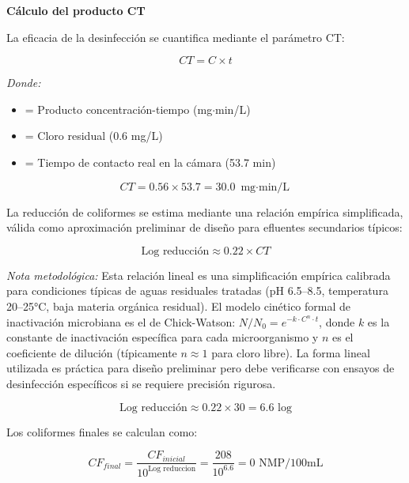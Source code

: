\documentclass[12pt,a4paper]{article}
\begin{document}
\textbf{Cálculo del producto CT}

La eficacia de la desinfección se cuantifica mediante el parámetro CT:

\begin{equation}
CT = C \times t
\end{equation}

\textit{Donde:}
\begin{itemize}[noitemsep,leftmargin=2em]
    \item[$CT$] = Producto concentración-tiempo (mg$\cdot$min/L)
    \item[$C$] = Cloro residual (0.6 mg/L)
    \item[$t$] = Tiempo de contacto real en la cámara (53.7 min)
\end{itemize}

\begin{equation}
CT = 0.56 \times 53.7 = 30.0 \text{ mg$\cdot$min/L}
\end{equation}

La reducción de coliformes se estima mediante una relación empírica simplificada, válida como aproximación preliminar de diseño para efluentes secundarios típicos:

\begin{equation}
\text{Log reducción} \approx 0.22 \times CT
\end{equation}

\textit{Nota metodológica:} Esta relación lineal es una simplificación empírica calibrada para condiciones típicas de aguas residuales tratadas (pH 6.5--8.5, temperatura 20--25°C, baja materia orgánica residual). El modelo cinético formal de inactivación microbiana es el de Chick-Watson: $N/N_0 = e^{-k \cdot C^n \cdot t}$, donde $k$ es la constante de inactivación específica para cada microorganismo y $n$ es el coeficiente de dilución (típicamente $n \approx 1$ para cloro libre). La forma lineal utilizada es práctica para diseño preliminar pero debe verificarse con ensayos de desinfección específicos si se requiere precisión rigurosa.

\begin{equation}
\text{Log reducción} \approx 0.22 \times 30 = 6.6 \text{ log}
\end{equation}

Los coliformes finales se calculan como:

\begin{equation}
CF_{final} = \frac{CF_{inicial}}{10^{\text{Log reduccion}}} = \frac{208}{10^{6.6}} = 0 \text{ NMP/100mL}
\end{equation}
\end{document}
